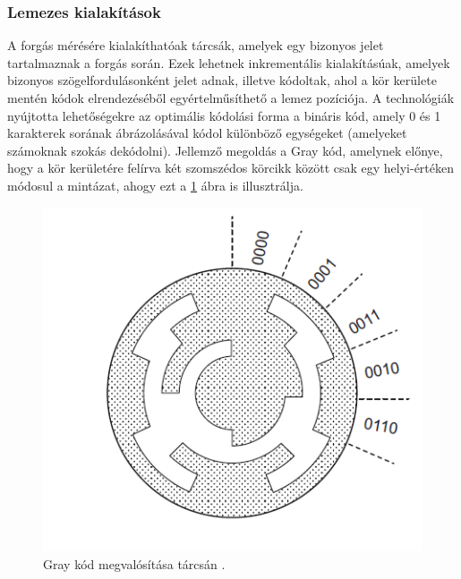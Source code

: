 \subsubsection{Lemezes kialakítások}
\label{optarcsa}

A forgás mérésére kialakíthatóak tárcsák, amelyek egy bizonyos jelet tartalmaznak a forgás során. Ezek lehetnek inkrementális kialakításúak, amelyek bizonyos szögelfordulásonként jelet adnak, illetve kódoltak, ahol a kör kerülete mentén kódok elrendezéséből egyértelműsíthető a lemez pozíciója. A technológiák nyújtotta lehetőségekre az optimális kódolási forma a bináris kód, amely 0 és 1 karakterek sorának ábrázolásával kódol különböző egységeket (amelyeket számoknak szokás dekódolni). Jellemző megoldás a Gray kód, amelynek előnye, hogy a kör kerületére felírva két szomszédos körcikk között csak egy helyi-értéken módosul a mintázat, ahogy ezt a \ref{gray} ábra is illusztrálja. 
\begin{figure}
	\centering
	\includegraphics[width=\columnwidth/2]{figures/gray.png}
	\caption{Gray kód megvalósítása tárcsán \cite{Morris2016b}.}
	\label{gray}
\end{figure}
